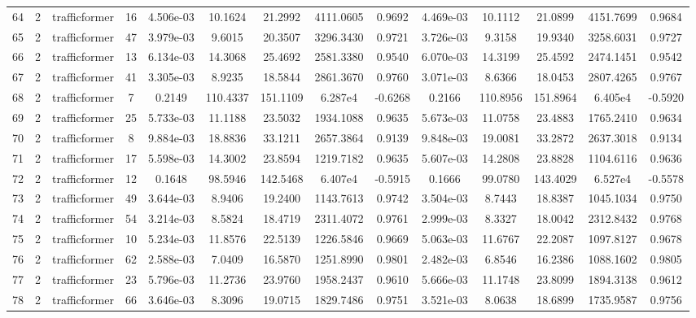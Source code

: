 \begin{landscape}
\begin{longtable}{c c c c c c c c c c c c c c}
	64 & 2 & trafficformer & 16 & 4.506e-03 & 10.1624 & 21.2992 & 4111.0605 & 0.9692 & 4.469e-03 & 10.1112 & 21.0899 & 4151.7699 & 0.9684 \\
	65 & 2 & trafficformer & 47 & 3.979e-03 & 9.6015 & 20.3507 & 3296.3430 & 0.9721 & 3.726e-03 & 9.3158 & 19.9340 & 3258.6031 & 0.9727 \\
	66 & 2 & trafficformer & 13 & 6.134e-03 & 14.3068 & 25.4692 & 2581.3380 & 0.9540 & 6.070e-03 & 14.3199 & 25.4592 & 2474.1451 & 0.9542 \\
	67 & 2 & trafficformer & 41 & 3.305e-03 & 8.9235 & 18.5844 & 2861.3670 & 0.9760 & 3.071e-03 & 8.6366 & 18.0453 & 2807.4265 & 0.9767 \\
	68 & 2 & trafficformer & 7 & 0.2149 & 110.4337 & 151.1109 & 6.287e4 & -0.6268 & 0.2166 & 110.8956 & 151.8964 & 6.405e4 & -0.5920 \\
	69 & 2 & trafficformer & 25 & 5.733e-03 & 11.1188 & 23.5032 & 1934.1088 & 0.9635 & 5.673e-03 & 11.0758 & 23.4883 & 1765.2410 & 0.9634 \\
	70 & 2 & trafficformer & 8 & 9.884e-03 & 18.8836 & 33.1211 & 2657.3864 & 0.9139 & 9.848e-03 & 19.0081 & 33.2872 & 2637.3018 & 0.9134 \\
	71 & 2 & trafficformer & 17 & 5.598e-03 & 14.3002 & 23.8594 & 1219.7182 & 0.9635 & 5.607e-03 & 14.2808 & 23.8828 & 1104.6116 & 0.9636 \\
	72 & 2 & trafficformer & 12 & 0.1648 & 98.5946 & 142.5468 & 6.407e4 & -0.5915 & 0.1666 & 99.0780 & 143.4029 & 6.527e4 & -0.5578 \\
	73 & 2 & trafficformer & 49 & 3.644e-03 & 8.9406 & 19.2400 & 1143.7613 & 0.9742 & 3.504e-03 & 8.7443 & 18.8387 & 1045.1034 & 0.9750 \\
	74 & 2 & trafficformer & 54 & 3.214e-03 & 8.5824 & 18.4719 & 2311.4072 & 0.9761 & 2.999e-03 & 8.3327 & 18.0042 & 2312.8432 & 0.9768 \\
	75 & 2 & trafficformer & 10 & 5.234e-03 & 11.8576 & 22.5139 & 1226.5846 & 0.9669 & 5.063e-03 & 11.6767 & 22.2087 & 1097.8127 & 0.9678 \\
	76 & 2 & trafficformer & 62 & 2.588e-03 & 7.0409 & 16.5870 & 1251.8990 & 0.9801 & 2.482e-03 & 6.8546 & 16.2386 & 1088.1602 & 0.9805 \\
	77 & 2 & trafficformer & 23 & 5.796e-03 & 11.2736 & 23.9760 & 1958.2437 & 0.9610 & 5.666e-03 & 11.1748 & 23.8099 & 1894.3138 & 0.9612 \\
	78 & 2 & trafficformer & 66 & 3.646e-03 & 8.3096 & 19.0715 & 1829.7486 & 0.9751 & 3.521e-03 & 8.0638 & 18.6899 & 1735.9587 & 0.9756 \\

\end{longtable}
\end{landscape}
